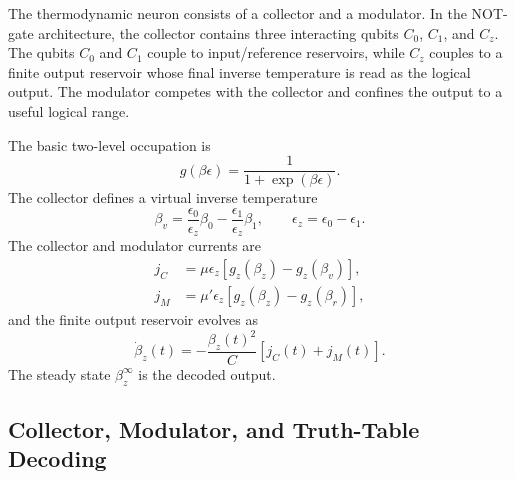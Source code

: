 \documentclass[11pt]{article}
\begin{document}
The thermodynamic neuron consists of a collector and a modulator.  In the NOT-gate
architecture, the collector contains three interacting qubits $C_0$, $C_1$, and $C_z$.
The qubits $C_0$ and $C_1$ couple to input/reference reservoirs, while $C_z$ couples to a
finite output reservoir whose final inverse temperature is read as the logical output.  The
modulator competes with the collector and confines the output to a useful logical range.

The basic two-level occupation is
\begin{equation}
    g(\beta\epsilon)
    =
    \frac{1}{1+\exp(\beta\epsilon)} .
\end{equation}
The collector defines a virtual inverse temperature
\begin{equation}
    \beta_v
    =
    \frac{\epsilon_0}{\epsilon_z}\beta_0
    -
    \frac{\epsilon_1}{\epsilon_z}\beta_1,
    \qquad
    \epsilon_z=\epsilon_0-\epsilon_1 .
\end{equation}
The collector and modulator currents are
\begin{align}
    j_C
    &=
    \mu\epsilon_z
    \left[
        g_z(\beta_z)-g_z(\beta_v)
    \right],\\
    j_M
    &=
    \mu'\epsilon_z
    \left[
        g_z(\beta_z)-g_z(\beta_r)
    \right],
\end{align}
and the finite output reservoir evolves as
\begin{equation}
    \dot\beta_z(t)
    =
    -\frac{\beta_z(t)^2}{C}
    \left[j_C(t)+j_M(t)\right].
\end{equation}
The steady state $\beta_z^\infty$ is the decoded output.

\subsection{Collector, Modulator, and Truth-Table Decoding}
\end{document}
